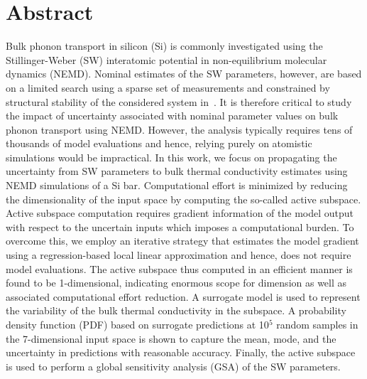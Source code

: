 \section*{Abstract}
Bulk phonon transport in silicon (Si) is commonly investigated using the
Stillinger-Weber (SW) interatomic potential in non-equilibrium molecular
dynamics (NEMD). Nominal estimates
of the SW parameters, however, are based on a limited search
using a sparse set of measurements and constrained by structural stability
of the considered system in~\cite{Stillinger:1985}. It is therefore
critical to study the impact of uncertainty associated with nominal
parameter values on bulk phonon transport using NEMD. 
However, the analysis typically requires tens of thousands of model evaluations
and hence, relying purely on atomistic simulations would be impractical.
In this work, we focus on propagating the uncertainty from SW parameters
to bulk thermal conductivity estimates using NEMD simulations of a Si bar.
Computational effort is minimized by reducing the
dimensionality of the input space by computing the so-called active subspace.
 Active subspace computation requires gradient information of
the model output with respect to the uncertain inputs which imposes a 
computational burden. To overcome this, we employ an iterative strategy
that estimates the model gradient using a regression-based local linear
approximation and hence, does not require model evaluations. 
The active subspace thus computed in an efficient manner is found to be
1-dimensional, indicating enormous scope for dimension as well as
associated computational effort reduction. A surrogate model is used to
represent the variability of the bulk thermal conductivity in the subspace.
A probability density function (PDF) based on surrogate predictions at 10$^5$
random samples in the
7-dimensional input space is shown to capture the mean, mode, and the
uncertainty in predictions with reasonable accuracy. Finally, the
active subspace is used to perform a global sensitivity analysis (GSA)
of the SW parameters.  

